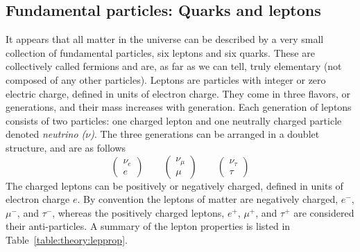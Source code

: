 \subsection{Fundamental particles: Quarks and leptons}
It appears that all matter in the universe can be described by a very small collection of fundamental particles, six leptons and six quarks. These are collectively called fermions and are, as far as we can tell, truly elementary (not composed of any other particles).
Leptons are particles with integer or zero electric charge, defined in units of electron charge. They come in three flavors, or generations, and their mass increases with generation. Each generation of leptons consists of two particles: one charged lepton and one neutrally charged particle denoted \emph{neutrino ($\nu$)}. The three generations can be arranged in a doublet structure, and are as follows
\begin{equation}
\label{eqn:lepton_flavor_doublets}
\begin{pmatrix} \nu_e      \\ e      \end{pmatrix} \qquad
\begin{pmatrix} \nu_{\mu}  \\ \mu    \end{pmatrix} \qquad
\begin{pmatrix} \nu_{\tau} \\ \tau   \end{pmatrix}
\end{equation}
The charged leptons can be positively or negatively charged, defined in units of electron charge $e$. By convention the leptons of matter are negatively charged, $e^{-}$, $\mu^{-}$, and $\tau^{-}$,  whereas the positively charged leptons,  $e^{+}$, $\mu^{+}$, and $\tau^{+}$ are considered their anti-particles.
A summary of the lepton properties is listed in Table~\ref{table:theory:lepprop}.
